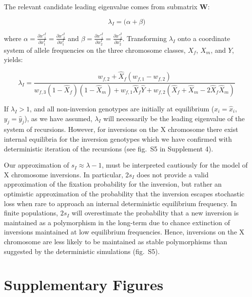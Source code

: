 \documentclass{article}
\begin{document}
\begin{appendices}
\noindent The relevant candidate leading eigenvalue comes from submatrix $\mathbf{W}$:

\begin{equation}
	\lambda_{I} = \big( \alpha + \beta \big)
\end{equation}

where $\alpha = \frac{\partial x'^I_1}{\partial x^I_1} = \frac{\partial x'^I_{2}}{\partial x^I_1}$ and $\beta = \frac{\partial x'^I_1}{\partial x^I_2} = \frac{\partial x'^I_{2}}{\partial x^I_2}$. Transforming $\lambda_I$ onto a coordinate system of allele frequencies on the three chromosome classes, $X_f$, $X_m$, and $Y$, yields:


\begin{equation}
	\lambda_I = \frac{w_{f,2} + \hat{X}_f(w_{f,1} - w_{f,2})} {w_{f,3}(1 - \hat{X}_f)(1 - \hat{X}_m) + w_{f,1} \hat{X}_f \hat{Y} + w_{f,2} (\hat{X}_f + \hat{X}_m - 2 \hat{X}_f \hat{X}_m)}
\end{equation}

\noindent If $\lambda_I > 1$, and all non-inversion genotypes are initially at equilibrium ($x_i = \hat{x}_i$, $y_j = \hat{y}_j$), as we have assumed, $\lambda_I$ will necessarily be the leading eigenvalue of the system of recursions. However, for inversions on the X chromosome there exist internal equilibria for the inversion genotypes which we have confirmed with deterministic iteration of the recursions (see fig.~S5 in Supplement 4). 

Our approximation of $s_I \approx \lambda - 1$, must be interpreted cautiously for the model of X chromosome inversions. In particular, $2 s_I$ does not provide a valid approximation of the fixation probability for the inversion, but rather an optimistic approximation of the probability that the inversion escapes stochastic loss when rare to approach an internal deterministic equilibrium frequency. In finite populations, $2 s_I$ will overestimate the probability that a new inversion is maintained as a polymorphism in the long-term due to chance extinction of inversions maintained at low equilibrium frequencies. Hence, inversions on the X chromosome are less likely to be maintained as stable polymorphisms than suggested by the deterministic simulations (fig.~S5).


 \section{Supplementary Figures} \label{SuppFigs}
 \renewcommand{\theequation}{S\arabic{equation}}
 \setcounter{equation}{0}
 \renewcommand{\thefigure}{S\arabic{figure}}
 \setcounter{figure}{0}


\end{appendices}
\end{document}
